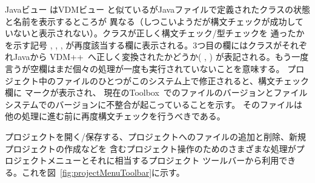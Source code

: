 \documentclass[\pformat,12pt]{jarticle}
\newcommand{\vdmslpp}{VDM++}
\newcommand{\Toolbox}{Toolbox}
\newcommand{\guicmd}[1]{{\gt #1}}
\begin{document}
\guicmd{Javaビュー} は\guicmd{VDMビュー} と似ているがJavaファイルで定義されたクラスの状態と名前を表示するところが
異なる（しつこいようだが構文チェックが成功していないと表示されない）。クラスが正しく構文チェック/型チェックを
通ったかを示す記号
,
,
,
が再度該当する欄に表示される。3つ目の欄にはクラスがそれぞれJavaから \vdmslpp\ へ正しく変換されたかどうか(
,
)
が表記される。もう一度言うが空欄はまだ個々の処理が一度も実行されていないことを意味する。
プロジェクト中のファイルのひとつがこのシステム上で修正されると、\guicmd{構文チェック} 欄に 
マークが表示され、
現在の\Toolbox\ でのファイルのバージョンとファイルシステムでのバージョンに不整合が起こっていることを示す。
そのファイルは他の処理に進む前に再度構文チェックを行うべきである。



プロジェクトを開く/保存する、プロジェクトへのファイルの追加と削除、新規プロジェクトの作成などを
含むプロジェクト操作のためのさまざまな処理が\guicmd{プロジェクト}メニューとそれに相当する\guicmd{プロジェクト}
ツールバーから利用できる。これを図~\ref{fig:projectMenuToolbar}に示す。
\end{document}
